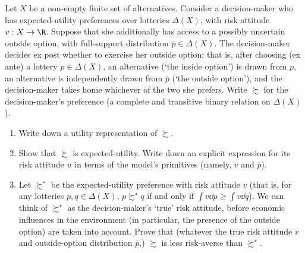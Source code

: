 \begin{exercise}[\cite{oo}]
	\label{exercise:oo}
	Let $X$ be a non-empty finite set of alternatives. Consider a decision-maker who has expected-utility preferences over lotteries $\Delta(X)$, with risk attitude $v : X \to \R$. Suppose that she additionally has access to a possibly uncertain outside option, with full-support distribution $\overline{p} \in \Delta(X)$. The decision-maker decides ex post whether to exercise her outside option: that is, after choosing (ex ante) a lottery $p \in \Delta(X)$, an alternative (`the inside option') is drawn from $p$, an alternative is independently drawn from $\overline{p}$ (`the outside option'), and the decision-maker takes home whichever of the two she prefers. Write $\succsim$ for the decision-maker's preference (a complete and transitive binary relation on $\Delta(X)$).

	\begin{enumerate}[label=(\alph*)]

		\item Write down a utility representation of $\succsim$.

		\item Show that $\succsim$ is expected-utility. Write down an explicit expression for its risk attitude $u$ in terms of the model's primitives (namely, $v$ and $\overline{p}$).

		\item Let $\succsim^\star$ be the expected-utility preference with risk attitude $v$ (that is, for any lotteries $p,q \in \Delta(X)$, $p \succsim^\star q$ if and only if $\int v \dd p \geq \int v \dd q$). We can think of $\succsim^\star$ as the decision-maker's `true' risk attitude, before economic influences in the environment (in particular, the presence of the outside option) are taken into account. Prove that (whatever the true risk attitude $v$ and outside-option distribution $\overline{p}$,) $\succsim$ is less risk-averse than $\succsim^\star$.

	\end{enumerate}
\end{exercise}

